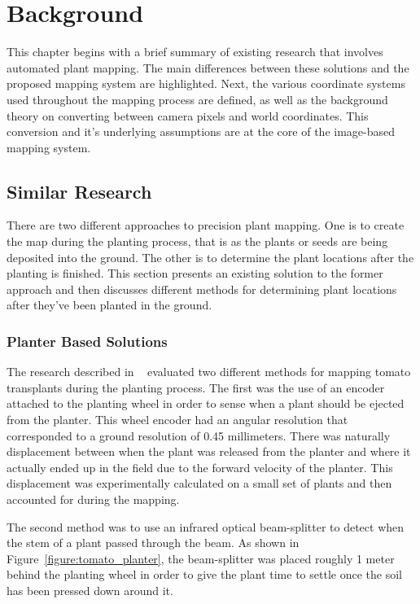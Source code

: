 
\cleardoublepage

\chapter{Background}
\label{background}

This chapter begins with a brief summary of existing research that involves automated plant mapping.  The main differences between these solutions and the proposed mapping system are highlighted.  Next, the various coordinate systems used throughout the mapping process are defined, as well as the background theory on converting between camera pixels and world coordinates.  This conversion and it's underlying assumptions are at the core of the image-based mapping system. 

\section{Similar Research}
\label{section:similar_research}

There are two different approaches to precision plant mapping.  One is to create the map during the planting process, that is as the plants or seeds are being deposited into the ground.  The other is to determine the plant locations after the planting is finished.  This section presents an existing solution to the former approach and then discusses different methods for determining plant locations after they've been planted in the ground. 

\subsection{Planter Based Solutions}

The research described in ~\citep{Sun:2010} evaluated two different methods for mapping tomato transplants during the planting process.  The first was the use of an encoder attached to the planting wheel in order to sense when a plant should be ejected from the planter. This wheel encoder had an angular resolution that corresponded to a ground resolution of 0.45 millimeters.  There was naturally displacement between when the plant was released from the planter and where it actually ended up in the field due to the forward velocity of the planter.  This displacement was experimentally calculated on a small set of plants and then accounted for during the mapping.  

The second method was to use an infrared optical beam-splitter to detect when the stem of a plant passed through the beam.  As shown in Figure~\ref{figure:tomato_planter}, the beam-splitter was placed roughly 1 meter behind the planting wheel in order to give the plant time to settle once the soil has been pressed down around it.  

